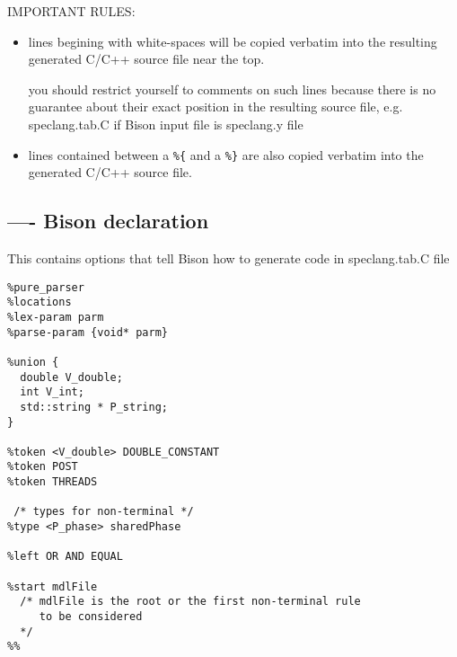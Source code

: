 IMPORTANT RULES:
\begin{itemize}
  \item lines begining with white-spaces will be copied verbatim into the
  resulting generated C/C++ source file near the top.
  
  you should restrict yourself to comments on such lines because there is no
  guarantee about their exact position in the resulting source file, e.g.
  speclang.tab.C if Bison input file is speclang.y file
  
  \item lines contained between a \verb!%{! and a \verb!%}! are also copied
  verbatim into the generated C/C++ source file.   
\end{itemize}

\subsection{---- Bison declaration}

This contains options that tell Bison how to generate code in speclang.tab.C file

{\tiny
\begin{verbatim}
%pure_parser
%locations
%lex-param parm
%parse-param {void* parm}

%union {
  double V_double;
  int V_int;
  std::string * P_string;
}

%token <V_double> DOUBLE_CONSTANT
%token POST
%token THREADS

 /* types for non-terminal */
%type <P_phase> sharedPhase

%left OR AND EQUAL

%start mdlFile
  /* mdlFile is the root or the first non-terminal rule
     to be considered
  */
%%
\end{verbatim}  
}

